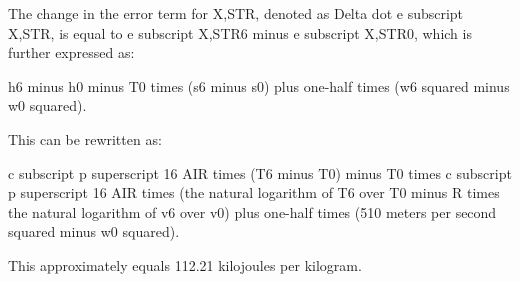 The change in the error term for X,STR, denoted as Delta dot e subscript X,STR, is equal to e subscript X,STR6 minus e subscript X,STR0, which is further expressed as:

h6 minus h0 minus T0 times (s6 minus s0) plus one-half times (w6 squared minus w0 squared).

This can be rewritten as:

c subscript p superscript 16 AIR times (T6 minus T0) minus T0 times c subscript p superscript 16 AIR times (the natural logarithm of T6 over T0 minus R times the natural logarithm of v6 over v0) plus one-half times (510 meters per second squared minus w0 squared).

This approximately equals 112.21 kilojoules per kilogram.